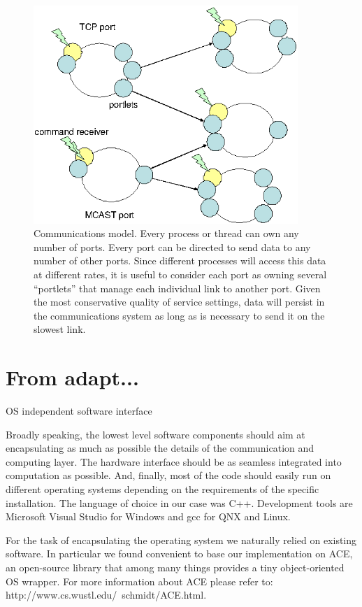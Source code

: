 
\begin{figure}[tb]
\centerline{
\includegraphics[width=10cm]{fig-port-portlets}
}
\caption[Interprocess communication model]{ 
%
Communications model.  Every process or thread can own
any number of ports.  Every port can be directed to send
data to any number of other ports.  Since different
processes will access this data at different rates,
it is useful to consider each port as owning several
``portlets'' that manage each individual link to another
port.  Given the most conservative quality of service settings,
data will persist in the communications system 
as long as is necessary to send it on the slowest link.
%
}
\label{fig:yarp-port}
\end{figure}

\section{From adapt...}

OS independent software interface

Broadly speaking, the lowest level software components should aim at
encapsulating as much as possible the details of the communication and
computing layer. The hardware interface should be as seamless
integrated into computation as possible. And, finally, most of the
code should easily run on different operating systems depending on the
requirements of the specific installation. The language of choice in
our case was C++. Development tools are Microsoft Visual Studio for
Windows and gcc for QNX and Linux.

For the task of encapsulating the operating system we naturally relied
on existing software. In particular we found convenient to base our
implementation on ACE, an open-source library that among many things
provides a tiny object-oriented OS wrapper. For more information about
ACE please refer to: http://www.cs.wustl.edu/~schmidt/ACE.html.

